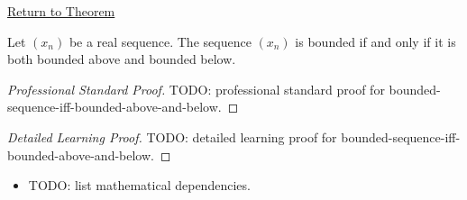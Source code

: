 \newpage
{}
\label{prf:bounded-sequence-bounded-above-below}

\begin{remark*}[Return]
\hyperref[thm:bounded-sequence-bounded-above-below]{Return to Theorem}
\end{remark*}

\begin{theorem*}
Let $(x_n)$ be a real sequence. The sequence $(x_n)$ is bounded if and only
if it is both bounded above and bounded below.

\smallskip
\noindent
\end{theorem*}

\begin{proof}[Professional Standard Proof]
\LRAProofBodyStart
TODO: professional standard proof for bounded-sequence-iff-bounded-above-and-below.
\end{proof}

\begin{proof}[Detailed Learning Proof]
\LRAProofBodyStart
TODO: detailed learning proof for bounded-sequence-iff-bounded-above-and-below.
\end{proof}

\begin{remark*}
\end{remark*}

\begin{dependencies}
\begin{itemize}
  \item TODO: list mathematical dependencies.
\end{itemize}
\end{dependencies}

\clearpage
